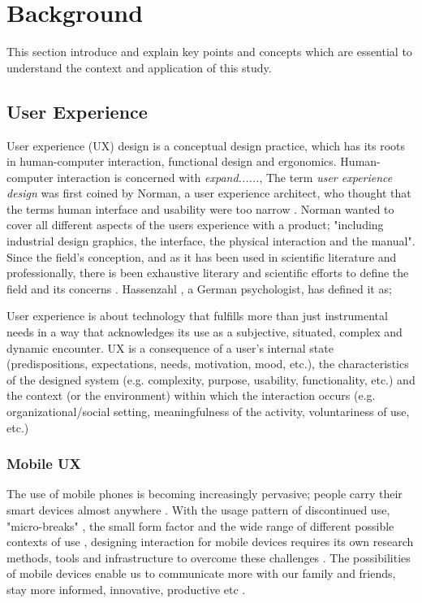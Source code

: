 \chapter{Background}
\label{chap:background}
This section introduce and explain key points and concepts which are essential to understand the context and application of this study.

\section{User Experience}
User experience (UX) design is a conceptual design practice, which has its roots in human-computer interaction, functional design and ergonomics. Human-computer interaction is concerned with \textit{expand......}, The term \textit{user experience design} was first coined by Norman, a user experience architect, who thought that the terms human interface and usability were too narrow \cite{Merholz2008}. Norman wanted to cover all different aspects of the users experience with a product; "including industrial design graphics, the interface, the physical interaction and the manual". Since the field's conception, and as it has been used in scientific literature and professionally, there is been exhaustive literary and scientific efforts to define the field and its concerns \cite{Law2008} \cite{Law2009} \cite{Forlizzi2000}. Hassenzahl \cite{Hassenzahl2006}, a German psychologist, has defined it as;
\begin{displayquote}
  User experience is about technology that fulfills more than just instrumental needs in a way that acknowledges its use as a subjective, situated, complex and dynamic encounter. UX is a consequence of a user's internal state (predispositions, expectations, needs, motivation, mood, etc.), the characteristics of the designed system (e.g. complexity, purpose, usability, functionality, etc.) and the context (or the environment) within which the interaction occurs (e.g. organizational/social setting, meaningfulness of the activity, voluntariness of use, etc.)
\end{displayquote}

\subsection{Mobile UX}
The use of mobile phones is becoming increasingly pervasive; people carry their smart devices almost anywhere \cite{Mallat2004}. With the usage pattern of discontinued use, "micro-breaks" \cite{McGregor2014a}, the small form factor and the wide range of different possible contexts of use \cite{Wang2016}, designing interaction for mobile devices requires its own research methods, tools and infrastructure to overcome these challenges \cite{Nakhimovsky2009}. The possibilities of mobile devices enable us to communicate more with our family and friends, stay more informed, innovative, productive etc \cite{Wang2016}.

